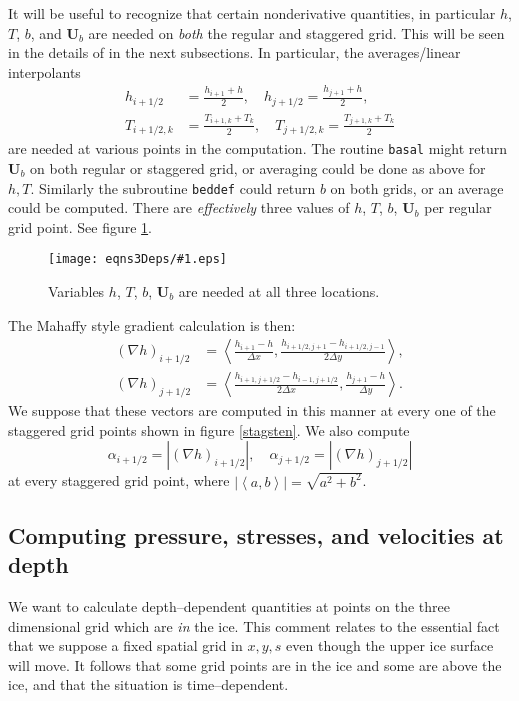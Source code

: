 \documentclass{amsart}%
\theoremstyle{plain}
\theoremstyle{definition}
\theoremstyle{remark}
\newcommand{\regfigure}[2]{\texttt{[image: eqns3Deps/\#1.eps]}}
\newcommand{\mtt}{\texttt}
\newcommand{\grad}{\nabla}
\newcommand{\ip}[2]{\ensuremath{\left<#1,#2\right>}}
\newcommand{\bU}{{\mathbf{U}}}
\begin{document}
It will be useful to recognize that certain nonderivative quantities, in particular $h$, $T$, $b$, and $\bU_b$ are needed on \emph{both} the regular and staggered grid.  This will be seen in the details of in the next subsections.  In particular, the averages/linear interpolants
\begin{align}
h_{i+1/2}&=\frac{h_{i+1}+h}{2}, \quad h_{j+1/2}=\frac{h_{j+1}+h}{2}, \\
T_{i+1/2,k}&=\frac{T_{i+1,k}+T_k}{2}, \quad T_{j+1/2,k}=\frac{T_{j+1,k}+T_k}{2}\end{align}
are needed at various points in the computation.  The routine \mtt{basal} might return $\bU_b$ on both regular or staggered grid, or averaging could be done as above for $h,T$.  Similarly the subroutine \mtt{beddef} could return $b$ on both grids, or an average could be computed.  There are \emph{effectively} three values of $h$, $T$, $b$, $\bU_b$ per regular grid point.  See figure \ref{molecule}.

\begin{figure}[ht]
\regfigure{molecule}{1.75}
\vspace{-5mm}
\caption{Variables $h$, $T$, $b$, $\bU_b$ are needed at all three locations.}
\label{molecule}
\end{figure}

The Mahaffy style gradient calculation is then:
\begin{align}
(\grad h)_{i+1/2} &= \ip{\frac{h_{i+1}-h}{\Delta x}}{\frac{h_{i+1/2,j+1}-h_{i+1/2,j-1}}{2\Delta y}}, \\
(\grad h)_{j+1/2} &= \ip{\frac{h_{i+1,j+1/2}-h_{i-1,j+1/2}}{2\Delta x}}{\frac{h_{j+1}-h}{\Delta y}}.
\end{align}
We suppose that these vectors are computed in this manner at every one of the staggered grid points shown in figure \ref{stagsten}.  We also compute
\begin{equation}
  \alpha_{i+1/2} = |(\grad h)_{i+1/2}|, \quad \alpha_{j+1/2} = |(\grad h)_{j+1/2}|
\end{equation}
at every staggered grid point, where $|\ip{a}{b}|=\sqrt{a^2+b^2}$.


\subsection{Computing pressure, stresses, and velocities at depth}\label{atdepthsubsect}  We want to calculate depth--dependent quantities at points on the three dimensional grid which are \emph{in} the ice.  This comment relates to the essential fact that we suppose a fixed spatial grid in $x,y,s$ even though the upper ice surface will move.  It follows that some grid points are in the ice and some are above the ice, and that the situation is time--dependent.
\end{document}
